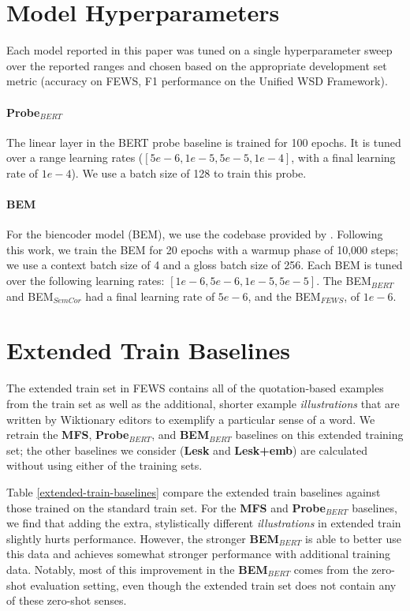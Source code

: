 \documentclass[11pt,a4paper]{article}
\begin{document}
\newpage
\appendix

\section{Model Hyperparameters}
\label{appendix-parameters}
Each model reported in this paper was tuned on a single hyperparameter sweep over the reported ranges and chosen based on the appropriate development set metric (accuracy on FEWS, F1 performance on the Unified WSD Framework). 

\paragraph{Probe$_{BERT}$} The linear layer in the BERT probe baseline is trained for 100 epochs. It is tuned over a range learning rates ($[5e-6, 1e-5, 5e-5, 1e-4]$, with a final learning rate of $1e-4$). We use a batch size of 128 to train this probe. 

\paragraph{BEM} For the biencoder model (BEM), we use the codebase provided by \cite{blevins2020moving}. Following this work, we train the BEM for 20 epochs with a warmup phase of 10,000 steps; we use a context batch size of 4 and a gloss batch size of 256. Each BEM is tuned over the following learning rates: $[1e-6, 5e-6, 1e-5, 5e-5]$. The BEM$_{BERT}$ and BEM$_{SemCor}$ had a final learning rate of $5e-6$, and the BEM$_{FEWS}$, of $1e-6$.

\section{Extended Train Baselines}
\label{appendix-extended_train}
The extended train set in FEWS contains all of the quotation-based examples from the train set as well as the additional, shorter example \textit{illustrations} that are written by Wiktionary editors to exemplify a particular sense of a word. We retrain the \textbf{MFS}, \textbf{Probe$_{BERT}$}, and \textbf{BEM$_{BERT}$} baselines on this extended training set; the other baselines we consider (\textbf{Lesk} and \textbf{Lesk+emb}) are calculated without using either of the training sets.

Table \ref{extended-train-baselines} compare the extended train baselines against those trained on the standard train set. For the \textbf{MFS} and \textbf{Probe$_{BERT}$} baselines, we find that adding the extra, stylistically different  \textit{illustrations} in extended train slightly hurts performance. However, the stronger \textbf{BEM$_{BERT}$} is able to better use this data and achieves somewhat stronger performance with additional training data. Notably, most of this improvement in the \textbf{BEM$_{BERT}$} comes from the zero-shot evaluation setting, even though the extended train set does not contain any of these zero-shot senses.
\end{document}
